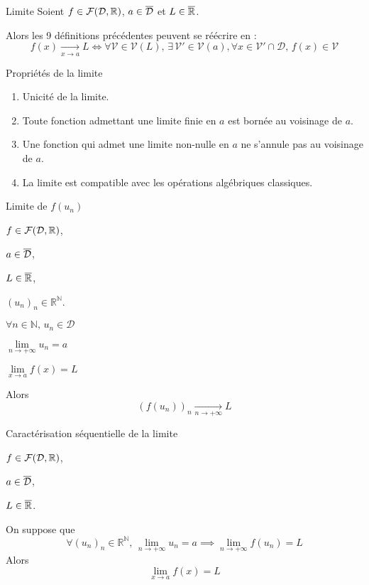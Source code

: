     \begin{defi}{Limite}{}
        Soient $f \in \mathcal{F}(\mathcal{D},\mathbb{R})$, $a \in \overline{\mathcal{D}}$ et $L \in \overline{\mathbb{R}}$.

        Alors les 9 définitions précédentes peuvent se réécrire en :
        \[ f(x) \underset{x \rightarrow a}{\longrightarrow} L \iff \forall \mathcal{V} \in \mathcal{V}(L), \, \exists \, \mathcal{V'} \in \mathcal{V}(a),
            \forall x \in \mathcal{V'} \cap \mathcal{D}, \, f(x) \in \mathcal{V} \]
    \end{defi}

    \begin{prop}{Propriétés de la limite}{}
        \begin{enumerate}
            \item Unicité de la limite.
            \item Toute fonction admettant une limite finie en $a$ est bornée au voisinage de $a$.
            \item Une fonction qui admet une limite non-nulle en $a$ ne s’annule pas au voisinage de $a$.
            \item La limite est compatible avec les opérations algébriques classiques.
        \end{enumerate}
    \end{prop}

    \begin{theo}{Limite de $f(u_n)$}{}
        \begin{soient}
            \item $f \in \mathcal{F}(\mathcal{D},\mathbb{R})$,
            \item $a \in \overline{\mathcal{D}}$,
            \item $L \in \overline{\mathbb{R}}$,
            \item $(u_n)_n \in \mathbb{R}^{\mathbb{N}}$.
        \end{soient}
        \begin{suppose}
            \item $\forall n \in \mathbb{N}, \, u_n \in \mathcal{D}$
            \item $\lim\limits_{n \rightarrow + \infty} u_n = a$
            \item $\lim\limits_{x \rightarrow a} f(x) = L$
        \end{suppose}
        Alors \[ (f(u_n))_n \underset{n \rightarrow +\infty}{\longrightarrow} L \]
    \end{theo}

    \begin{theo}{Caractérisation séquentielle de la limite}{}
        \begin{soient}
            \item $f \in \mathcal{F}(\mathcal{D},\mathbb{R})$,
            \item $a \in \overline{\mathcal{D}}$,
            \item $L \in \overline{\mathbb{R}}$.
        \end{soient}
        On suppose que 
        \[ \forall (u_n)_n \in \mathbb{R}^{\mathbb{N}}, \, \lim\limits_{n \rightarrow + \infty} u_n = a \implies \lim\limits_{n \rightarrow + \infty} f(u_n) = L \]
        Alors \[ \underset{x \rightarrow a}{\lim} f(x) = L \]
    \end{theo}

